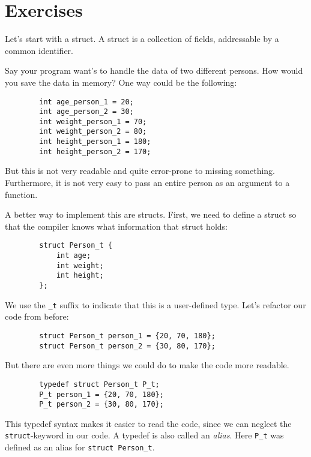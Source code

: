 \documentclass{dcbl/challenge}
\begin{document}
\section*{Exercises}
\begin{aufgabe}
    Let's start with a struct. 
    A struct is a collection of fields, addressable by a common identifier.
    
    Say your program want's to handle the data of two different persons. 
    How would you save the data in memory?
    One way could be the following:
    \begin{lstlisting}
        int age_person_1 = 20;
        int age_person_2 = 30;
        int weight_person_1 = 70;
        int weight_person_2 = 80;
        int height_person_1 = 180;
        int height_person_2 = 170;
    \end{lstlisting}
    But this is not very readable and quite error-prone to missing something. Furthermore, it is not very easy to pass an entire person as an argument to a function.
    
    A better way to implement this are structs. 
    First, we need to define a struct so that the compiler knows what information that struct holds:
    \begin{lstlisting}
        struct Person_t {
            int age;
            int weight;
            int height;
        };
    \end{lstlisting}
    We use the \texttt{\_t} suffix to indicate that this is a user-defined type.
    Let's refactor our code from before:
    \begin{lstlisting}
        struct Person_t person_1 = {20, 70, 180};
        struct Person_t person_2 = {30, 80, 170};
    \end{lstlisting}
    
    But there are even more things we could do to make the code more readable. 
    \begin{lstlisting}
        typedef struct Person_t P_t;
        P_t person_1 = {20, 70, 180};
        P_t person_2 = {30, 80, 170};
    \end{lstlisting}
    This typedef syntax makes it easier to read the code, since we can neglect the \texttt{struct}-keyword in our code.
    A typedef is also called an \textit{alias}. Here \texttt{P\_t} was defined as an alias for \texttt{struct Person\_t}.
    

\end{aufgabe}
\end{document}
